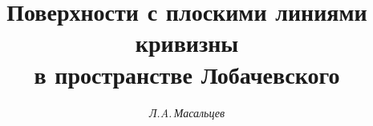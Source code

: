 






\newcommand{\la}{\langle}


\newcommand{\ra}{\rangle}


\newcommand{\tg}{\operatorname{tg}}


\newcommand{\ch}{\operatorname{ch}}


\newcommand{\sh}{\operatorname{sh}}


\newcommand{\th}{\operatorname{th}}


\newcommand{\const}{\operatorname{const}}


\newcommand{\PR}{\operatorname{Pr}}


\newcommand{\tts}[1]{}







\setcounter{page}{39}















\author{\it Л.A.\,Масальцев}




\title{Поверхности с плоскими линиями кривизны\\


в пространстве Лобачевского}





\date{}




\pagestyle{plain} %





